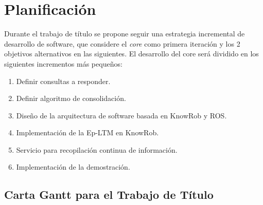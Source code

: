 

\section{Planificación}

Durante el trabajo de título se propone seguir una estrategia incremental de desarrollo de software, que considere el \textit{core} como primera iteración y los 2 objetivos alternativos en las siguientes. El desarrollo del core será dividido en los siguientes incrementos más pequeños:
\begin{enumerate}[topsep=0pt]
\setlength\itemsep{0.2em}
\item Definir consultas a responder.

\item Definir algoritmo de consolidación.

\item Diseño de la arquitectura de software basada en KnowRob y ROS.

\item Implementación de la Ep-LTM en KnowRob.

\item Servicio para recopilación continua de información.

\item Implementación de la demostración.
\end{enumerate}


\subsection{Carta Gantt para el Trabajo de Título}


